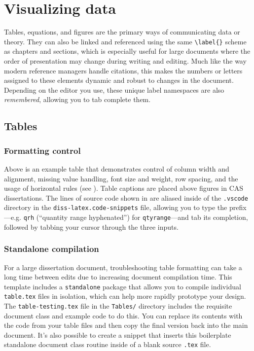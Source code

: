\documentclass[../../main.tex]{subfiles}  %
\begin{document}
\section{Visualizing data}

	Tables, equations, and figures are the primary ways of communicating data or theory. 
	They can also be linked and referenced using the same \verb|\label{}| scheme as chapters and sections, which is especially useful for large documents where the order of presentation may change during writing and editing.
	Much like the way modern reference managers handle citations, this makes the numbers or letters assigned to these elements dynamic and robust to changes in the document.
	Depending on the editor you use, these unique label namespaces are also \textit{remembered}, allowing you to tab complete them.

	\subsection{Tables}

	\subsubsection{Formatting control}

	Above is an example table that demonstrates control of column width and alignment, missing value handling, font size and weight, row spacing, and the usage of horizontal rules (see ). 
	Table captions are placed above figures in CAS dissertations. 
	The lines of source code shown in  are aliased inside of the \texttt{.vscode} directory in the \texttt{diss-latex.code-snippets} file, allowing you to type the prefix---e.g. \verb|qrh| (``quantity range hyphenated'') for \verb|qtyrange|---and tab its completion, followed by tabbing your cursor through the three inputs.

	\subsubsection{Standalone compilation}

	For a large dissertation document, troubleshooting table formatting can take a long time between edits due to increasing document compilation time.
	This template includes a \verb|standalone| package that allows you to compile individual \texttt{table.tex} files in isolation, which can help more rapidly prototype your design.
	The \texttt{table-testing.tex} file in the \texttt{Tables/} directory includes the requisite document class and example code to do this. 
	You can replace its contents with the code from your table files and then copy the final version back into the main document.
	It's also possible to create a snippet that inserts this boilerplate standalone document class routine inside of a blank source \texttt{.tex} file.
\end{document}
